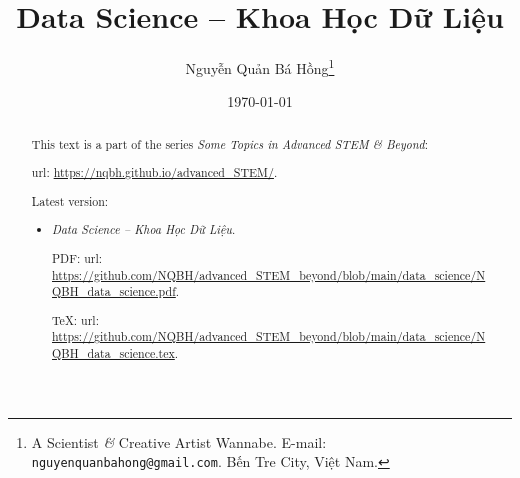 \documentclass{article}
\title{Data Science -- Khoa Học Dữ Liệu}
\author{Nguyễn Quản Bá Hồng\footnote{A Scientist {\it\&} Creative Artist Wannabe. E-mail: {\tt nguyenquanbahong@gmail.com}. Bến Tre City, Việt Nam.}}
\date{\today}
\begin{document}
\maketitle
\begin{abstract}
	This text is a part of the series {\it Some Topics in Advanced STEM \& Beyond}:
	
	{\sc url}: \url{https://nqbh.github.io/advanced_STEM/}.
	
	Latest version:
	\begin{itemize}
		\item {\it Data Science -- Khoa Học Dữ Liệu}.
		
		PDF: {\sc url}: \url{https://github.com/NQBH/advanced_STEM_beyond/blob/main/data_science/NQBH_data_science.pdf}.
		
		\TeX: {\sc url}: \url{https://github.com/NQBH/advanced_STEM_beyond/blob/main/data_science/NQBH_data_science.tex}.
	\end{itemize}
\end{abstract}
\tableofcontents

\end{document}
